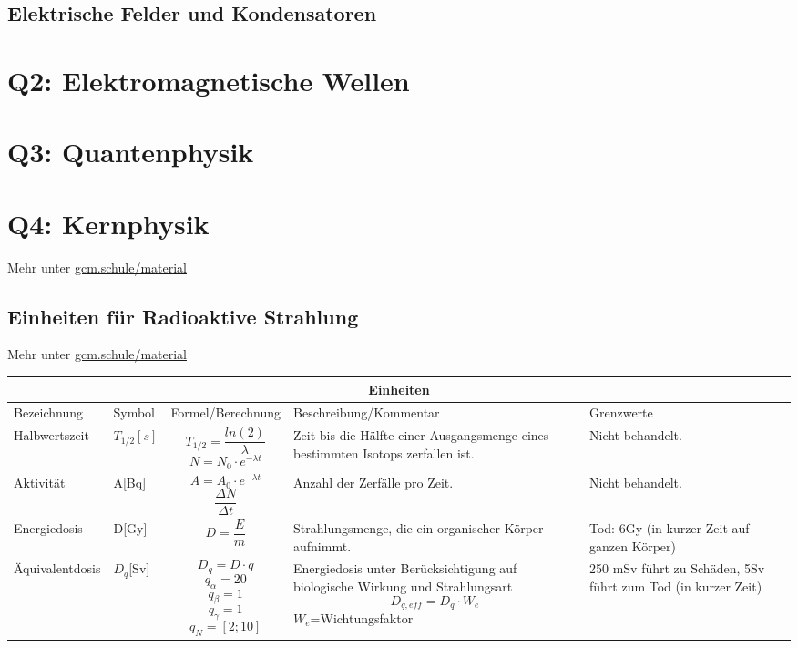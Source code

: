 \documentclass{article}
\begin{document}
        \subsection{Elektrische Felder und Kondensatoren}

    \section{Q2: Elektromagnetische Wellen}

    \section{Q3: Quantenphysik}

    \section{Q4: Kernphysik}

        Mehr unter \href{https://gcm.schule/material/2024/physik/lk13/}{gcm.schule/material}

        \subsection{Einheiten für Radioaktive Strahlung}

        Mehr unter \href{https://gcm.schule/material/2024/physik/lk13/q4_wopla-05.md}{gcm.schule/material}

        \begin{tabular}{ |p{4cm}|p{1cm}|p{3cm}|p{4cm}|p{4cm}|  }
            \hline
            \multicolumn{5}{|c|}{\textbf{Einheiten}} \\
            \hline
            Bezeichnung & Symbol & Formel/Berechnung & Beschreibung/Kommentar & Grenzwerte \\
            \hline
            Halbwertszeit   & $ T_{1/2} [s] $   & \[ T_{1/2}=\frac{ln(2)}{\lambda} \] \[N=N_0 \cdot e^{-\lambda t}\] &   Zeit bis die Hälfte einer Ausgangsmenge eines bestimmten Isotops zerfallen ist. & Nicht behandelt. \\
            \hline
            Aktivität & A[Bq] &   \[A=A_0 \cdot e^{-\lambda t}\] \[\frac{\Delta N}{\Delta t}\]  & Anzahl der Zerfälle pro Zeit.   & Nicht behandelt. \\
            \hline
            Energiedosis & D[Gy] & \[D=\frac{E}{m}\] &  Strahlungsmenge, die ein organischer Körper aufnimmt. & Tod: 6Gy (in kurzer Zeit auf ganzen Körper)\\
            \hline
            Äquivalentdosis & $D_q$[Sv]& \[ D_q = D \cdot q \] \[q_{\alpha}=20\] \[q_{\beta}=1\]\[q_{\gamma}=1\] \[q_{N}=[2;10]\] & Energiedosis unter Berücksichtigung auf biologische Wirkung und Strahlungsart \[D_{q,eff}=D_q \cdot W_e\] $W_e$=Wichtungsfaktor & 250 mSv führt zu Schäden, 5Sv führt zum Tod (in kurzer Zeit) \\
            \hline
           \end{tabular}
\end{document}
